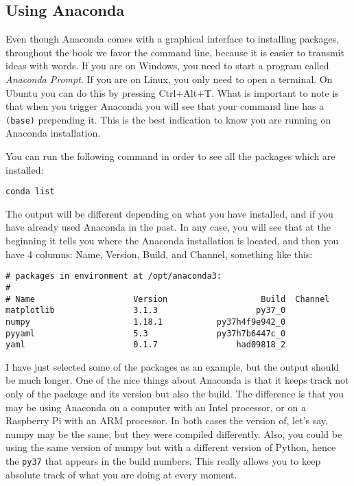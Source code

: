 \subsection{Using Anaconda}
Even though Anaconda comes with a graphical interface to installing packages, throughout the book we favor the command line, because it is easier to transmit ideas with words. If you are on Windows, you need to start a program called \emph{Anaconda Prompt}. If you are on Linux, you only need to open a terminal. On Ubuntu you can do this by pressing Ctrl+Alt+T. What is important to note is that when you trigger Anaconda you will see that your command line has a \texttt{(base)} prepending it. This is the best indication to know you are running on Anaconda installation. 

You can run the following command in order to see all the packages which are installed:

\begin{verbatim}
conda list
\end{verbatim}

The output will be different depending on what you have installed, and if you have already used Anaconda in the past. In any case, you will see that at the beginning it tells you where the Anaconda installation is located, and then you have 4 columns: Name, Version, Build, and Channel, something like this:

\begin{verbatim}
# packages in environment at /opt/anaconda3:
#
# Name                    Version                   Build  Channel
matplotlib                3.1.3                    py37_0
numpy                     1.18.1           py37h4f9e942_0
pyyaml                    5.3              py37h7b6447c_0
yaml                      0.1.7                had09818_2
\end{verbatim}

I have just selected some of the packages as an example, but the output should be much longer. One of the nice things about Anaconda is that it keeps track not only of the package and its version but also the build. The difference is that you may be using Anaconda on a computer with an Intel processor, or on a Raspberry Pi with an ARM processor. In both cases the version of, let's say, numpy may be the same, but they were compiled differently. Also, you could be using the same version of numpy but with a different version of Python, hence the \texttt{py37} that appears in the build numbers. This really allows you to keep absolute track of what you are doing at every moment. 

